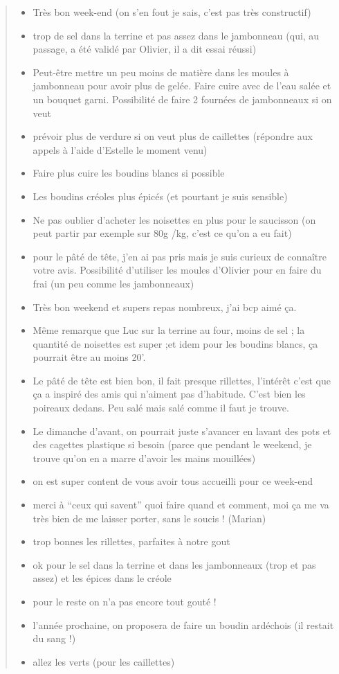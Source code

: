 \documentclass[]{article}
\providecommand{\tightlist}{%
  \setlength{\itemsep}{0pt}\setlength{\parskip}{0pt}}
\begin{document}
\begin{quote}
\begin{itemize}
\tightlist
\item
  Très bon week-end (on s'en fout je sais, c'est pas très constructif)
\item
  trop de sel dans la terrine et pas assez dans le jambonneau (qui, au
  passage, a été validé par Olivier, il a dit essai réussi)
\item
  Peut-être mettre un peu moins de matière dans les moules à jambonneau
  pour avoir plus de gelée. Faire cuire avec de l'eau salée et un
  bouquet garni. Possibilité de faire 2 fournées de jambonneaux si on
  veut
\item
  prévoir plus de verdure si on veut plus de caillettes (répondre aux
  appels à l'aide d'Estelle le moment venu)
\item
  Faire plus cuire les boudins blancs si possible
\item
  Les boudins créoles plus épicés (et pourtant je suis sensible)
\item
  Ne pas oublier d'acheter les noisettes en plus pour le saucisson (on
  peut partir par exemple sur 80g /kg, c'est ce qu'on a eu fait)
\item
  pour le pâté de tête, j'en ai pas pris mais je suis curieux de
  connaître votre avis. Possibilité d'utiliser les moules d'Olivier pour
  en faire du frai (un peu comme les jambonneaux)
\item
  Très bon weekend et supers repas nombreux, j'ai bcp aimé ça.
\item
  Même remarque que Luc sur la terrine au four, moins de sel ; la
  quantité de noisettes est super ;et idem pour les boudins blancs, ça
  pourrait être au moins 20'.
\item
  Le pâté de tête est bien bon, il fait presque rillettes, l'intérêt
  c'est que ça a inspiré des amis qui n'aiment pas d'habitude. C'est
  bien les poireaux dedans. Peu salé mais salé comme il faut je trouve.
\item
  Le dimanche d'avant, on pourrait juste s'avancer en lavant des pots et
  des cagettes plastique si besoin (parce que pendant le weekend, je
  trouve qu'on en a marre d'avoir les mains mouillées)
\item
  on est super content de vous avoir tous accueilli pour ce week-end
\item
  merci à ``ceux qui savent'' quoi faire quand et comment, moi ça me va
  très bien de me laisser porter, sans le soucis ! (Marian)
\item
  trop bonnes les rillettes, parfaites à notre gout
\item
  ok pour le sel dans la terrine et dans les jambonneaux (trop et pas
  assez) et les épices dans le créole
\item
  pour le reste on n'a pas encore tout gouté !
\item
  l'année prochaine, on proposera de faire un boudin ardéchois (il
  restait du sang !)
\item
  allez les verts (pour les caillettes)
\end{itemize}
\end{quote}
\end{document}
